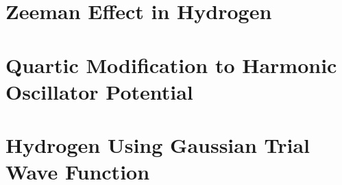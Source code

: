 \documentclass[
a4paper,
10pt,
twoside,
]{article}
\begin{document}
\titleinf
\maketitle
\startmcols

\section{Zeeman Effect in Hydrogen}\label{sec: I}
\subsection{}\label{ssec: Ia}
\subsection{}\label{ssec: Ib}
\subsection{}\label{ssec: Ic}
\subsection{}\label{ssec: Id}

\section{Quartic Modification to Harmonic Oscillator Potential}\label{sec: II}
\subsection{}\label{ssec: IIa}
\subsection{}\label{ssec: IIb}
\subsection{}\label{ssec: IIc}
\subsection{}\label{ssec: IId}


\section{Hydrogen Using Gaussian Trial Wave Function}\label{sec: III}




\stopmcols
\end{document}
